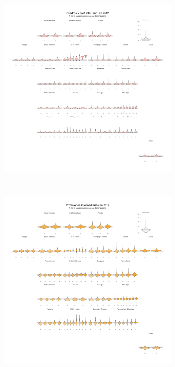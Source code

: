 \begin{figure}
\begin{subfigure}{0.235\textwidth}
	\end{subfigure}
	~
	\begin{subfigure}{0.235\textwidth}
	\includegraphics[width = \textwidth]{Figs/AED/Geofacet_Distr_por_Dpto_CSP3_2012}
	\end{subfigure}
	~
	\begin{subfigure}{0.235\textwidth}
	\includegraphics[width = \textwidth]{Figs/AED/Geofacet_Distr_por_Dpto_CSP4_2012}

\end{subfigure}
\end{figure}
